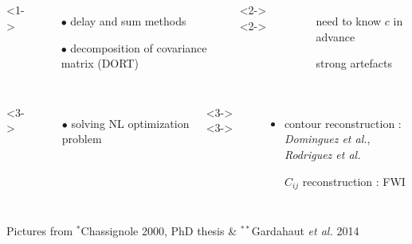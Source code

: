\documentclass[11pt,xcolor=x11names,compress, notes=show]{beamer}%
\begin{document}
\begin{frame}{\insertsectionhead}
\begin{columns}[c]
	\end{columns}
	\vspace{0.3cm}
	\begin{columns}[c]
			<1->
				\begin{itemize}
					\item[$\bullet$] delay and sum methods
					\item[$\bullet$] decomposition of covariance matrix (DORT)
				\end{itemize}
			<2->
			<2->
				\begin{itemize}
					\item[\ding{55}] need to know $c$ in advance\\
					\item[\ding{55}] strong artefacts
				\end{itemize}
			
	\end{columns}
	\begin{columns}[c]
		<3->
			\begin{itemize}
				\item[$\bullet$] solving NL optimization problem
			\end{itemize}
		<3->
		<3->
			\begin{itemize}
			\item contour reconstruction :\\\hspace{-0.5cm}\small{\emph{Dominguez et al.}, \emph{Rodriguez et al.}}\\[0.1cm]
			\item[\ding{51}] \normalsize{$C_{ij}$ reconstruction : FWI}
		\end{itemize}		
	\end{columns}
\vfill
{\tiny Pictures from $^{*}$Chassignole 2000, PhD thesis \& $^{**}$Gardahaut \emph{et al.} 2014}\vspace{-0.5cm}
\end{frame} 
\end{document}
